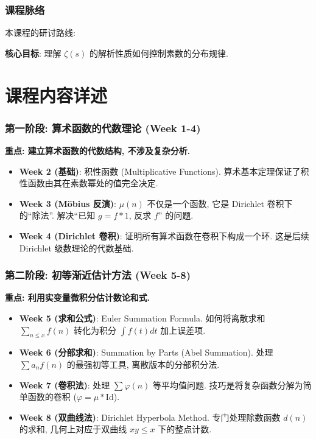 \begin{frame}
\frametitle{课程脉络}
本课程的研讨路线:
\begin{center}
\end{center}
\textbf{核心目标}: 理解 $\zeta(s)$ 的解析性质如何控制素数的分布规律.
\end{frame}


\section{课程内容详述}

\begin{frame}
\frametitle{第一阶段: 算术函数的代数理论 (Week 1-4)}
\textbf{重点: 建立算术函数的代数结构, 不涉及复杂分析.}
\begin{itemize}
    \item \textbf{Week 2 (基础)}: 积性函数 (Multiplicative Functions). 算术基本定理保证了积性函数由其在素数幂处的值完全决定.
    \item \textbf{Week 3 (Möbius 反演)}: $\mu(n)$ 不仅是一个函数, 它是 Dirichlet 卷积下的``除法''. 解决``已知 $g = f * 1$, 反求 $f$'' 的问题.
    \item \textbf{Week 4 (Dirichlet 卷积)}: 证明所有算术函数在卷积下构成一个环. 这是后续 Dirichlet 级数理论的代数基础.
\end{itemize}
\end{frame}

\begin{frame}
\frametitle{第二阶段: 初等渐近估计方法 (Week 5-8)}
\textbf{重点: 利用实变量微积分估计数论和式.}
\begin{itemize}
    \item \textbf{Week 5 (求和公式)}: Euler Summation Formula. 如何将离散求和 $\sum_{n \le x} f(n)$ 转化为积分 $\int f(t)dt$ 加上误差项.
    \item \textbf{Week 6 (分部求和)}: Summation by Parts (Abel Summation). 处理 $\sum a_n f(n)$ 的最强初等工具, 离散版本的分部积分法.
    \item \textbf{Week 7 (卷积法)}: 处理 $\sum \varphi(n)$ 等平均值问题. 技巧是将复杂函数分解为简单函数的卷积 ($\varphi = \mu * \mathrm{Id}$).
    \item \textbf{Week 8 (双曲线法)}: Dirichlet Hyperbola Method. 专门处理除数函数 $d(n)$ 的求和, 几何上对应于双曲线 $xy \le x$ 下的整点计数.
\end{itemize}
\end{frame}

